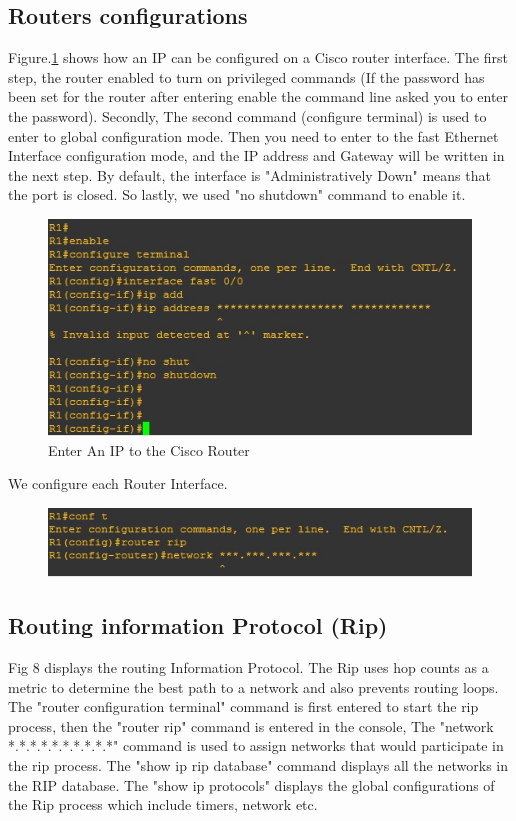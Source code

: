 \documentclass{article}
\begin{document}
\subsection{Routers configurations}

Figure.\ref{fig:Termconf} shows how an IP can be configured on a Cisco router interface. The first step, the router enabled to turn on privileged commands (If the password has been set for the router after entering enable the command line asked you to enter the password). Secondly, The second command (configure terminal) is used to enter to global configuration mode. Then you need to enter to the fast Ethernet Interface configuration mode, and the IP address and Gateway will be written in the next step. By default, the interface is "Administratively Down" means that the port is closed. So lastly, we used "no shutdown" command to enable it.

\begin{figure}[H]
	\begin{center}
		\includegraphics[width=0.6
\textwidth]{Terminalconf.jpg}
	\end{center}
	\caption{\small Enter An IP to the Cisco Router \newline}
	\label{fig:Termconf}
\end{figure}

We configure each Router Interface.\\


\begin{figure}[H]
	\begin{center}
		\includegraphics[width=0.6
\textwidth]{RouterRip.jpg}
	\end{center}
	\caption{\small  \newline}
	\label{fig:Prd}
\end{figure}
\subsection{Routing information Protocol (Rip)} Fig 8 displays the routing Information Protocol. The Rip uses hop counts as a metric to determine the best path to a network and also prevents routing loops. The "router configuration terminal" command is first entered to start the rip process, then the "router rip" command is entered in the console, The "network *.*.*.*.*.*.*.*.*.*" command is used to assign networks that would participate in the rip process. The "show ip rip database" command displays all the networks in the RIP database. The "show ip protocols" displays the global configurations of the Rip process which include timers, network etc.
\end{document}
